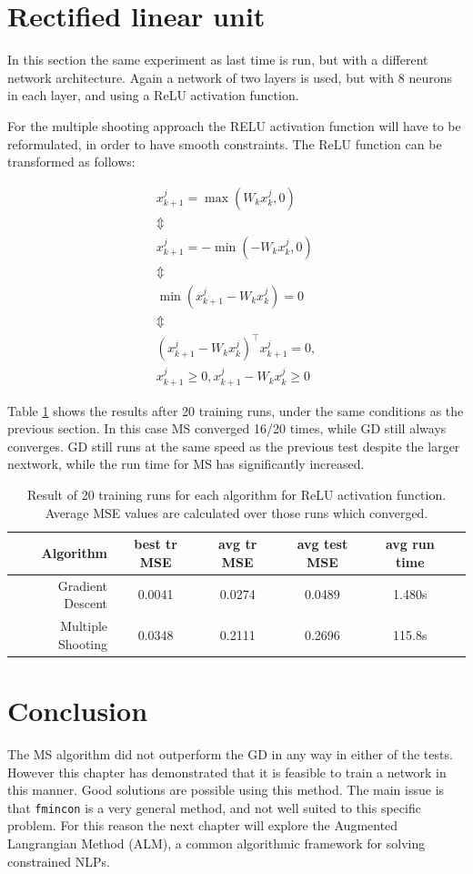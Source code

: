 \section{Rectified linear unit}
In this section the same experiment as last time is run, but with a different network architecture. Again a network of two layers is used, but with 8 neurons in each layer, and using a ReLU activation function. 

For the multiple shooting approach the RELU activation function will have to be reformulated, in order to have smooth constraints. The ReLU function can be transformed as follows:

\begin{gather*}
   x_{k+1}^j = \max(W_kx_k^j,0) \\
   \Updownarrow \\
   x_{k+1}^j = -\min(-W_kx_k^j,0) \\
   \Updownarrow \\
   \min(x_{k+1}^j-W_kx_k^j) = 0 \\
   \Updownarrow \\
   (x_{k+1}^j-W_kx_k^j)^\top x_{k+1}^j = 0,\\
   x_{k+1}^j\geq 0,x_{k+1}^j-W_kx_k^j\geq 0
\end{gather*}


Table \ref{tab:relu} shows the results after 20 training runs, under the same conditions as the previous section. In this case MS converged 16/20 times, while GD still always converges. GD still runs at the same speed as the previous test despite the larger nextwork, while the run time for MS has significantly increased. 
   
   
\begin{table}
	\centering
	\begin{tabular}{r | c c c c c}
		Algorithm & \small best tr MSE & \small avg tr MSE & \small avg test MSE & \small avg run time \\ \hline
		Gradient Descent & 0.0041 & 0.0274 & 0.0489 & 1.480s \\
		Multiple Shooting & 0.0348 & 0.2111 & 0.2696 & 115.8s \\
	\end{tabular}
	\caption{Result of 20 training runs for each algorithm for ReLU activation function. Average MSE values are calculated over those runs which converged.}
	\label{tab:relu}
\end{table}


\section{Conclusion}
The MS algorithm did not outperform the GD in any way in either of the tests. However this chapter has demonstrated that it is feasible to train a network in this manner. Good solutions are possible using this method. The main issue is that \texttt{fmincon} is a very general method, and not well suited to this specific problem. For this reason the next chapter will explore the Augmented Langrangian Method (ALM), a common algorithmic framework for solving constrained NLPs.




